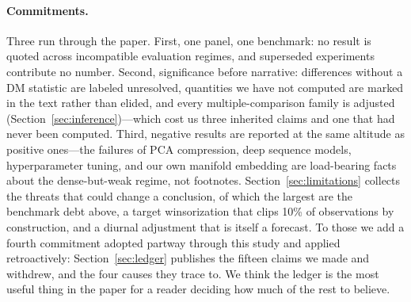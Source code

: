 \paragraph{Commitments.} Three run through the paper. First, one panel, one benchmark: no result is quoted across incompatible evaluation regimes, and superseded experiments contribute no number. Second, significance before narrative: differences without a DM statistic are labeled unresolved, quantities we have not computed are marked in the text rather than elided, and every multiple-comparison family is adjusted (Section~\ref{sec:inference})---which cost us three inherited claims and one that had never been computed. Third, negative results are reported at the same altitude as positive ones---the failures of PCA compression, deep sequence models, hyperparameter tuning, and our own manifold embedding are load-bearing facts about the dense-but-weak regime, not footnotes. Section~\ref{sec:limitations} collects the threats that could change a conclusion, of which the largest are the benchmark debt above, a target winsorization that clips 10\% of observations by construction, and a diurnal adjustment that is itself a forecast. To those we add a fourth commitment adopted partway through this study and applied retroactively: Section~\ref{sec:ledger} publishes the fifteen claims we made and withdrew, and the four causes they trace to. We think the ledger is the most useful thing in the paper for a reader deciding how much of the rest to believe.

